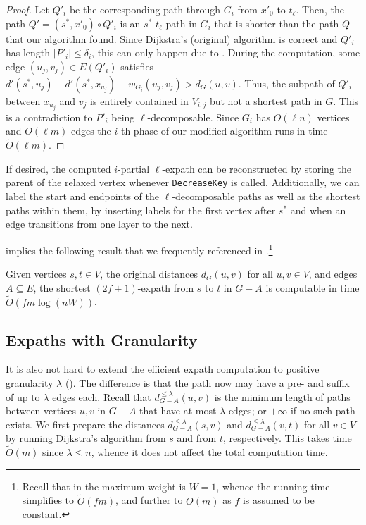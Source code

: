 \documentclass{theoretics}
\newcommand*{\Otilde}{\widetilde{O}}
\newcommand*{\length}[1]{|#1|}
\renewcommand{\le}{\leqslant}
\begin{document}
\begin{proof}
Let $Q'_i$ be the corresponding path through $G_i$ from $x'_0$ to $t_{\ell}$.
Then, the path $Q' = (s^*, x'_0) \circ Q'_i$ is an $s^*$-$t_{\ell}$-path in $G_i$ 
that is shorter than the path $Q$ that our algorithm found.
Since Dijkstra's (original) algorithm is correct and $Q'_i$ has length $\length{P'_i} \le \delta_i$, this can only happen due to .
During the computation, some edge $(u_j,v_j) \in E(Q'_i)$ 
satisfies $d'(s^*,u_j) - d'(s^*,x_{u_j}) + w_{G_i}(u_j,v_j) > d_G(u,v)$.
Thus, the subpath of $Q'_i$ between $x_{u_j}$ and $v_j$ is 
entirely contained in $V_{i,j}$ but not a shortest path in $G$.
This is a contradiction to $P'_i$ being $\ell$-decomposable.
%
Since $G_i$ has $O(\ell n)$ vertices and $O(\ell m)$ edges the $i$-th phase of
our modified algorithm runs in time $\Otilde(\ell m)$.
\end{proof}

If desired, the computed $i$-partial $\ell$-expath can be reconstructed by storing the parent of the relaxed vertex whenever \texttt{DecreaseKey} is called.
Additionally, we can label the start and endpoints of the $\ell$-decomposable paths 
as well as the shortest paths within them, by inserting labels for the first vertex after $s^*$
and when an edge transitions from one layer to the next.


 implies the following result
that we frequently referenced in .\footnote{%
	Recall that in 
	the maximum weight is $W = 1$, whence the running time simplifies to $\Otilde(fm)$,
	and further to $\Otilde(m)$ as $f$ is assumed to be constant.
}

\begin{corollary}
Given vertices $s,t \in V$, the original distances $d_G(u,v)$ for all $u,v \in V$,
and edges $A \subseteq E$, the shortest $(2f{+}1)$-expath from $s$ to $t$ in $G{-}A$
is computable in time $\Otilde(fm \log(nW))$.
\end{corollary}


\subsection{Expaths with Granularity}
\label{subsec:improved_preproc_granularity}

It is also not hard to extend the efficient expath computation to positive granularity $\lambda$
().
The difference is that the path now may have a pre- and suffix of up to $\lambda$ edges each.
Recall that $d_{G-A}^{\le \lambda}(u,v)$ is the minimum length of paths 
between vertices $u,v$ in $G-A$
that have at most $\lambda$ edges; or $+\infty$ if no such path exists.
We first prepare the distances $d_{G-A}^{\le \lambda}(s,v)$
and $d_{G-A}^{\le \lambda}(v,t)$ for all $v \in V$ by running Dijkstra's algorithm
from $s$ and from $t$, respectively.
This takes time $\Otilde(m)$ since $\lambda \le n$,
whence it does not affect the total computation time.
\end{document}
